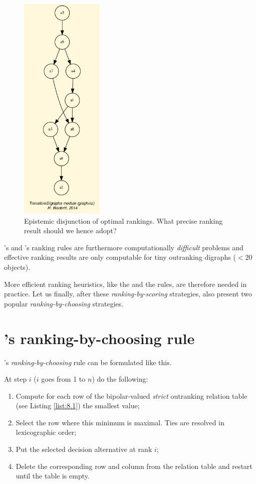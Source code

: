 \begin{figure}[h]
\sidecaption
\includegraphics[width=4cm]{Figures/tutorialSlater.png}
\caption{Epistemic disjunction of optimal \Slater rankings. What precise \Slater ranking result should we hence adopt?}
\label{fig:8.4}       %
\end{figure}
       
\Kemeny 's and \Slater 's ranking rules are furthermore computationally \emph{difficult} problems and effective ranking results are only computable for tiny outranking digraphs ($< 20$ objects). 

More efficient ranking heuristics, like the \Copeland and the \NetFlows rules, are therefore needed in practice. Let us finally, after these \emph{ranking-by-scoring} strategies, also present two popular \emph{ranking-by-choosing} strategies.

\section{\Kohler 's ranking-by-choosing rule}
\label{sec:8.6}

\Kohler 's \emph{ranking-by-choosing} rule can be formulated like this. 

At step $i$ ($i$ goes from 1 to $n$) do the following:
\begin{enumerate}
\item Compute for each row of the bipolar-valued \emph{strict} outranking relation table (see Listing \ref{list:8.1}) the smallest value;
\item Select the row where this minimum is maximal. Ties are resolved in lexicographic order;
\item Put the selected decision alternative at rank $i$;
\item Delete the corresponding row and column from the relation table and restart until the table is empty.
\end{enumerate}

